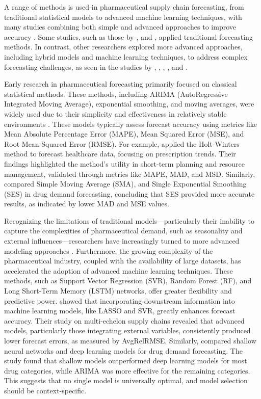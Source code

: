 \documentclass[
  authoryear,
  preprint,
  3p]{elsarticle}
\begin{document}
A range of methods is used in pharmaceutical supply chain forecasting,
from traditional statistical models to advanced machine learning
techniques, with many studies combining both simple and advanced
approaches to improve accuracy
\citep{nikolopoulos2016forecasting, zhu2021demand, anusha2014demand}.
Some studies, such as those by \citet{newberne2006holt}, and
\citet{restyana2021analysis}, applied traditional forecasting methods.
In contrast, other researchers explored more advanced approaches,
including hybrid models and machine learning techniques, to address
complex forecasting challenges, as seen in the studies by
\citet{siddiqui2022hybrid}, \citet{de2021lead}, \citet{kim2015demand},
\citet{candan2014demand}, and \citet{ribeiro2017improving}.

Early research in pharmaceutical forecasting primarily focused on
classical statistical methods. These methods, including ARIMA
(AutoRegressive Integrated Moving Average), exponential smoothing, and
moving averages, were widely used due to their simplicity and
effectiveness in relatively stable environments
\citep{zahra2019forecasting}. These models typically assess forecast
accuracy using metrics like Mean Absolute Percentage Error (MAPE), Mean
Squared Error (MSE), and Root Mean Squared Error (RMSE). For example,
\citet{newberne2006holt} applied the Holt-Winters method to forecast
healthcare data, focusing on prescription trends. Their findings
highlighted the method's utility in short-term planning and resource
management, validated through metrics like MAPE, MAD, and MSD.
Similarly, \citet{restyana2021analysis} compared Simple Moving Average
(SMA), and Single Exponential Smoothing (SES) in drug demand
forecasting, concluding that SES provided more accurate results, as
indicated by lower MAD and MSE values.

Recognizing the limitations of traditional models---particularly their
inability to capture the complexities of pharmaceutical demand, such as
seasonality and external influences---researchers have increasingly
turned to more advanced modeling approaches
\citep{khalil2014intelligent}. Furthermore, the growing complexity of
the pharmaceutical industry, coupled with the availability of large
datasets, has accelerated the adoption of advanced machine learning
techniques. These methods, such as Support Vector Regression (SVR),
Random Forest (RF), and Long Short-Term Memory (LSTM) networks, offer
greater flexibility and predictive power. \citet{van2021using} showed
that incorporating downstream information into machine learning models,
like LASSO and SVR, greatly enhances forecast accuracy. Their study on
multi-echelon supply chains revealed that advanced models, particularly
those integrating external variables, consistently produced lower
forecast errors, as measured by AvgRelRMSE. Similarly,
\citet{rathipriya2023demand} compared shallow neural networks and deep
learning models for drug demand forecasting. The study found that
shallow models outperformed deep learning models for most drug
categories, while ARIMA was more effective for the remaining categories.
This suggests that no single model is universally optimal, and model
selection should be context-specific.
\end{document}
